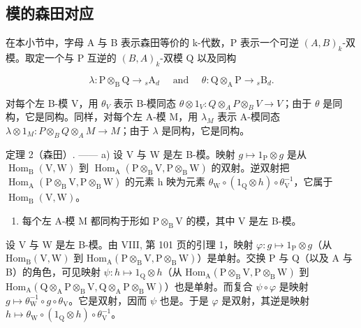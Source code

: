 \subsection{模的森田对应}

在本小节中，字母 A 与 B 表示森田等价的 k-代数，P 表示一个可逆 \((A,B)_{k}\)-双模。取定一个与 P 互逆的 \((B,A)_{k}\)-双模 Q 以及同构

\[
\lambda : \mathrm{P} \otimes_ {\mathrm{B}} \mathrm{Q} \rightarrow {} _ {s} \mathrm{A} _ {d} \quad \text { and } \quad \theta : \mathrm{Q} \otimes_ {\mathrm{A}} \mathrm{P} \rightarrow {} _ {s} \mathrm{B} _ {d}.
\]

对每个左 B-模 V，用 \(\theta_{V}\) 表示 B-模同态 \(\theta\otimes1_{V}:Q\otimes_{A}P\otimes_{B}V\to V\)；由于 \(\theta\) 是同构，它是同构。同样，对每个左 A-模 M，用 \(\lambda_{M}\) 表示 A-模同态 \(\lambda\otimes1_{M}:P\otimes_{B}Q\otimes_{A}M\to M\)；由于 \(\lambda\) 是同构，它是同构。

定理 2（森田）. —— a) 设 V 与 W 是左 B-模。映射 \(g \mapsto 1_{\mathrm{P}} \otimes g\) 是从 \(\operatorname{Hom}_{\mathrm{B}}(\mathrm{V}, \mathrm{W})\) 到 \(\operatorname{Hom}_{\mathrm{A}}(\mathrm{P} \otimes_{\mathrm{B}} \mathrm{V}, \mathrm{P} \otimes_{\mathrm{B}} \mathrm{W})\) 的双射。逆双射把 \(\operatorname{Hom}_{\mathrm{A}}(\mathrm{P} \otimes_{\mathrm{B}} \mathrm{V}, \mathrm{P} \otimes_{\mathrm{B}} \mathrm{W})\) 的元素 h 映为元素 \(\theta_{\mathrm{W}} \circ (1_{\mathrm{Q}} \otimes h) \circ \theta_{\mathrm{V}}^{-1}\)，它属于 \(\operatorname{Hom}_{\mathrm{B}}(\mathrm{V}, \mathrm{W})\)。

\begin{enumerate}
\def\labelenumi{\alph{enumi})}
\setcounter{enumi}{1}
\tightlist
\item
  每个左 A-模 M 都同构于形如 \(\mathrm{P} \otimes_{\mathrm{B}} \mathrm{V}\) 的模，其中 V 是左 B-模。
\end{enumerate}

设 V 与 W 是左 B-模。由 VIII, 第 101 页的引理 1，映射 \(\varphi : g \mapsto 1_{\mathrm{P}} \otimes g\)（从 \(\mathrm{Hom}_{\mathrm{B}}(\mathrm{V}, \mathrm{W})\) 到 \(\mathrm{Hom}_{\mathrm{A}}(\mathrm{P} \otimes_{\mathrm{B}} \mathrm{V}, \mathrm{P} \otimes_{\mathrm{B}} \mathrm{W})\)）是单射。交换 P 与 Q（以及 A 与 B）的角色，可见映射 \(\psi : h \mapsto 1_{\mathrm{Q}} \otimes h\)（从 \(\mathrm{Hom}_{\mathrm{A}}(\mathrm{P} \otimes_{\mathrm{B}} \mathrm{V}, \mathrm{P} \otimes_{\mathrm{B}} \mathrm{W})\) 到 \(\mathrm{Hom}_{\mathrm{A}}(\mathrm{Q} \otimes_{\mathrm{A}} \mathrm{P} \otimes_{\mathrm{B}} \mathrm{V}, \mathrm{Q} \otimes_{\mathrm{A}} \mathrm{P} \otimes_{\mathrm{B}} \mathrm{W})\)）也是单射。而复合 \(\psi \circ \varphi\) 是映射 \(g \mapsto \theta_{\mathrm{W}}^{-1} \circ g \circ \theta_{\mathrm{V}}\)。它是双射，因而 \(\psi\) 也是。于是 \(\varphi\) 是双射，其逆是映射 \(h \mapsto \theta_{\mathrm{W}} \circ (1_{\mathrm{Q}} \otimes h) \circ \theta_{\mathrm{V}}^{-1}\)。

